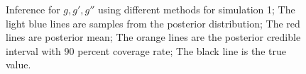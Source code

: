 \documentclass{article}
\begin{document}
\begin{figure}[p]
{    }
    \caption{Inference for $g,g',g''$ using different methods for simulation 1; The light blue lines are samples from the posterior distribution; The red lines are posterior mean; The orange lines are the posterior credible interval with 90 percent coverage rate; The black line is the true value.}
    \label{fig:sim1-1replic}
\end{figure}
\end{document}
